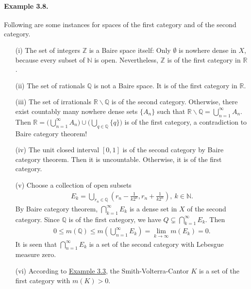 \documentclass{article}
\begin{document}
\paragraph{Example 3.8.\label{example:3.8}} Following are some instances for spaces of the first category and of the second category.
\begin{itemize}
\vspace{0.1cm}
\item[(i)] The set of integers $\mathbb{Z}$ is a Baire space itself: Only $\emptyset$ is nowhere dense in $X$, because every subset of $\mathbb{N}$ is open. Nevertheless, $\mathbb{Z}$ is of the first category in $\mathbb{R}$.
\vspace{0.1cm}
\item[(ii)] The set of rationals $\mathbb{Q}$ is not a Baire space. It is of the first category in $\mathbb{R}$.
\vspace{0.1cm}
\item[(iii)] The set of irrationals $\mathbb{R}\backslash\mathbb{Q}$ is of the second category. Otherwise, there exist countably many nowhere dense sets $\{A_n\}$ such that $\mathbb{R}\backslash\mathbb{Q}=\bigcup_{n=1}^\infty A_n$. Then $\mathbb{R}=\bigl(\bigcup_{n=1}^\infty A_n\bigr)\cup\bigl(\bigcup_{q\in\mathbb{Q}}\{q\}\bigr)$ is of the first category, a contradiction to Baire category theorem!
\vspace{0.1cm}
\item[(iv)] The unit closed interval $[0,1]$ is of the second category by Baire category theorem. Then it is uncountable. Otherwise, it is of the first category.
\vspace{0.1cm}
\item[(v)] Choose a collection of open subsets
\begin{align*}
	E_k = \bigcup_{r_n\in\mathbb{Q}}\left(r_n-\frac{1}{k2^n},r_n+\frac{1}{k2^n}\right),\ k\in\mathbb{N}.
\end{align*}
By Baire category theorem, $\bigcap_{k=1}^\infty E_k$ is a dense set in $X$ of the second category. Since $\mathbb{Q}$ is of the first category, we have $Q\subsetneq \bigcap_{k=1}^\infty E_k$. Then
\begin{align*}
	0\leq m(\mathbb{Q}) \leq m\left(\bigcup_{n=1}^\infty E_k\right) = \lim_{k\to\infty} m(E_k) = 0.
\end{align*}
It is seen that $\bigcap_{n=1}^\infty E_k$ is a set of the second category with Lebesgue measure zero.
\vspace{0.1cm}
\item[(vi)] According to \hyperref[example:3.3]{Example 3.3}, the Smith-Volterra-Cantor $K$ is a set of the first category with $m(K)>0$.
\end{itemize}
\end{document}
